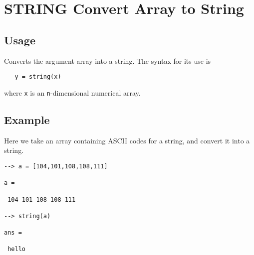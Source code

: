 \section{STRING Convert Array to String}

\subsection{Usage}

Converts the argument array into a string.  The syntax for its
use is
\begin{verbatim}
   y = string(x)
\end{verbatim}
where \verb|x| is an \verb|n|-dimensional numerical array.
\subsection{Example}

Here we take an array containing ASCII codes for a string, and
convert it into a string.
\begin{verbatim}
--> a = [104,101,108,108,111]

a = 

 104 101 108 108 111 

--> string(a)

ans = 

 hello
\end{verbatim}
